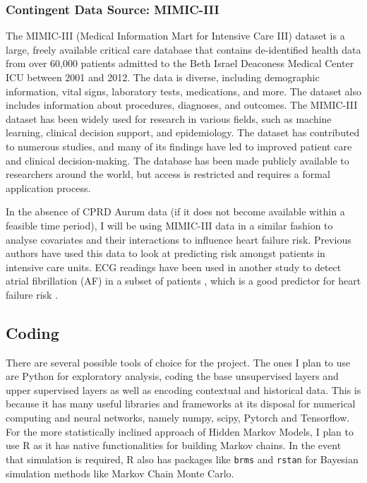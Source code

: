 \documentclass[%
 reprint,
 amsmath,amssymb,
 aps,
 nofootinbib,
]{revtex4-2}
\theoremstyle{definition}
\begin{document}
\subsubsection{\label{mimiciii} Contingent Data Source: MIMIC-III}

The MIMIC-III (Medical Information Mart for Intensive Care III) dataset is a large, freely available critical care database that contains de-identified health data from over 60,000 patients admitted to the Beth Israel Deaconess Medical Center ICU between 2001 and 2012. The data is diverse, including demographic information, vital signs, laboratory tests, medications, and more. The dataset also includes information about procedures, diagnoses, and outcomes. The MIMIC-III dataset has been widely used for research in various fields, such as machine learning, clinical decision support, and epidemiology. The dataset has contributed to numerous studies, and many of its findings have led to improved patient care and clinical decision-making. The database has been made publicly available to researchers around the world, but access is restricted and requires a formal application process.

In the absence of CPRD Aurum data (if it does not become available within a feasible time period), I will be using MIMIC-III data in a similar fashion to analyse covariates and their interactions to influence heart failure risk. Previous authors \cite{Lie044779} have used this data to look at predicting risk amongst patients in intensive care units. ECG readings have been used in another study to detect atrial fibrillation (AF) in a subset of patients \cite{Bashar8856496}, which is a good predictor for heart failure risk \cite{AFHFRisk}.

\subsection{\label{coding}Coding}

There are several possible tools of choice for the project. The ones I plan to use are Python for exploratory analysis, coding the base unsupervised layers and upper supervised layers as well as encoding contextual and historical data. This is because it has many useful libraries and frameworks at its disposal for numerical computing and neural networks, namely numpy, scipy, Pytorch and Tensorflow. For the more statistically inclined approach of Hidden Markov Models, I plan to use R as it has native functionalities for building Markov chains. In the event that simulation is required, R also has packages like \texttt{brms} and \texttt{rstan} for Bayesian simulation methods like Markov Chain Monte Carlo.
\end{document}
